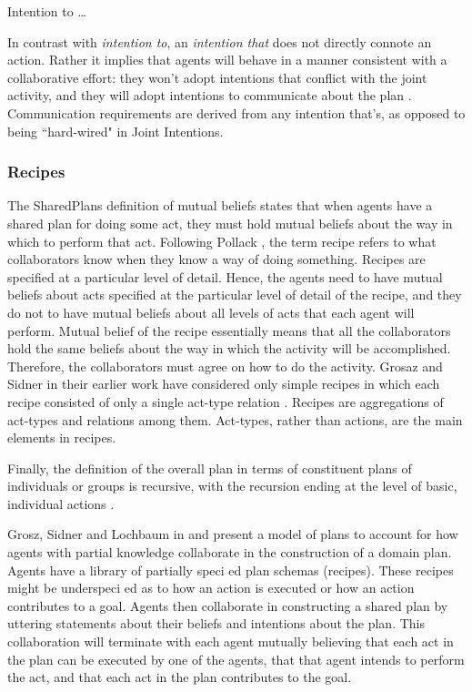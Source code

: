 \documentclass[11pt]{article}
\begin{document}
Intention to \ldots

In contrast with \textit{intention to}, an \textit{intention that} does not
directly connote an action. Rather it implies that agents will behave in a
manner consistent with a collaborative effort: they won't adopt intentions that
conflict with the joint activity, and they will adopt intentions to communicate
about the plan \cite{grosz:collaboration}. Communication requirements are
derived from any intention that's, as opposed to being ``hard-wired" in Joint
Intentions.

\subsubsection{Recipes}

The SharedPlans definition of mutual beliefs states that when agents have a
shared plan for doing some act, they must hold mutual beliefs about the way in
which to perform that act. Following Pollack
\cite{pollack:plan-mental-attitudes}, the term recipe refers to what
collaborators know when they know a way of doing something. Recipes are
specified at a particular level of detail. Hence, the agents need to have mutual
beliefs about acts specified at the particular level of detail of the recipe,
and they do not to have mutual beliefs about all levels of acts that each agent
will perform. Mutual belief of the recipe essentially means that all the
collaborators hold the same beliefs about the way in which the activity will be
accomplished. Therefore, the collaborators must agree on how to do the activity.
Grosaz and Sidner in their earlier work \cite{grosz:plans-discourse} have
considered only simple recipes in which each recipe consisted of only a single
act-type relation \cite{lochbaum:plan-models}. Recipes are aggregations of
act-types and relations among them. Act-types, rather than actions, are the main
elements in recipes.

Finally, the definition of the overall plan in terms of constituent plans of
individuals or groups is recursive, with the recursion ending at the level of
basic, individual actions \cite{grosz:mice-menus}.

Grosz, Sidner and Lochbaum in \cite{grosz:plans-discourse} and
\cite{lochbaum:plan-models} present a model of plans to account for how agents
with partial knowledge collaborate in the construction of a domain plan. Agents
have a library of partially speci ed plan schemas (recipes). These recipes might
be underspeci ed as to how an action is executed or how an action contributes to
a goal. Agents then collaborate in constructing a shared plan by uttering
statements about their beliefs and intentions about the plan. This collaboration
will terminate with each agent mutually believing that each act in the plan can
be executed by one of the agents, that that agent intends to perform the act,
and that each act in the plan contributes to the goal.
\end{document}
